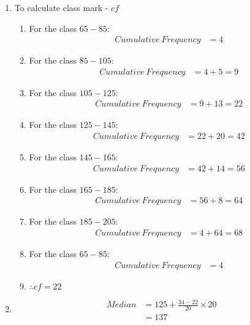 \begin{enumerate}
\item To calculate class mark - $cf$
\begin{enumerate}

\item For the class $65-85$:
\begin{align*}
Cumulative\ Frequency &= 4
\end{align*}

\item For the class $85-105$:
\begin{align*}
Cumulative\ Frequency &= 4 + 5 = 9
\end{align*}

\item For the class $105-125$:
\begin{align*}
Cumulative\ Frequency &= 9 + 13 = 22
\end{align*}

\item For the class $125-145$:
\begin{align*}
Cumulative\ Frequency &= 22 + 20 = 42
\end{align*}

\item For the class $145-165$:
\begin{align*}
Cumulative\ Frequency &= 42 + 14 = 56
\end{align*}

\item For the class $165-185$:
\begin{align*}
Cumulative\ Frequency &= 56 + 8 = 64
\end{align*}

\item For the class $185-205$:
\begin{align*}
Cumulative\ Frequency &= 4 + 64 = 68
\end{align*}

\item For the class $65-85$:
\begin{align*}
Cumulative\ Frequency &= 4
\end{align*}

\item $\therefore cf = 22 $
\end{enumerate}

\item 
\begin{align*}
Median &= 125 + \frac{34 - 22}{20} \times 20\\
&= 137
\end{align*}


\end{enumerate}
